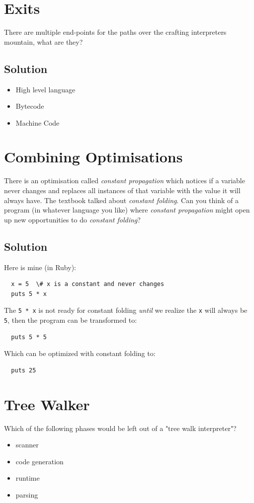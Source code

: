 \documentclass[twoside=false, DIV=14]{scrartcl}
\begin{document}
\section*{Exits}
  There are multiple end-points for the paths over the crafting interpreters mountain, what are they?
\subsection*{Solution}
    \begin{itemize}
      \item High level language
      \item Bytecode
      \item Machine Code
    \end{itemize}


\section*{Combining Optimisations}
  There is an optimisation called \emph{constant propagation} which notices if a variable never changes and replaces all instances of that variable with the value it will always have. The textbook talked about \emph{constant folding}. Can you think of a program (in whatever language you like) where \emph{constant propagation} might open up new opportunities to do \emph{constant folding}?
\subsection*{Solution}
  Here is mine (in Ruby):
  \begin{verbatim}
  x = 5  \# x is a constant and never changes
  puts 5 * x
  \end{verbatim}
  The \texttt{5 * x} is not ready for constant folding \emph{until} we realize the \texttt{x} will always be \texttt{5}, then the program can be transformed to:
  \begin{verbatim}
  puts 5 * 5
  \end{verbatim}
  Which can be optimized with constant folding to:
  \begin{verbatim}
  puts 25
  \end{verbatim}

\section*{Tree Walker}
Which of the following phases would be left out of a "tree walk interpreter"?
\begin{itemize}
    \item scanner
    \item code generation
    \item runtime
    \item parsing
\end{itemize}
\end{document}
